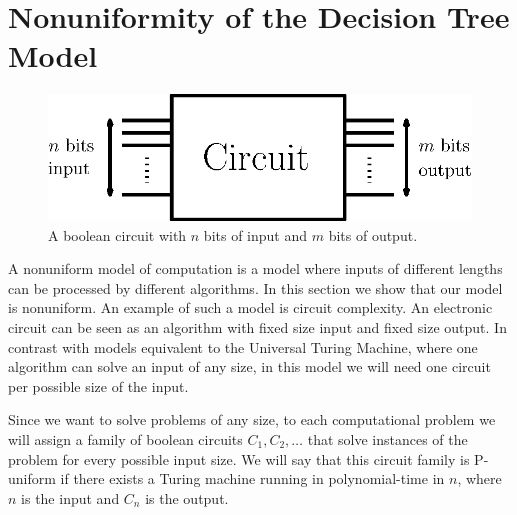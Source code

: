 \section{Nonuniformity of the Decision Tree Model}
\label{tree:sorting:nonuniformity}

\begin{figure}
\center
\includegraphics[height=0.2\textheight]{fig/sorting/model/circuit}
\caption{A boolean circuit with \(n\) bits of input and \(m\) bits of output.}
\label{fig:sorting:nonuniformity:circuit}
\end{figure}

A nonuniform model of computation is a model where inputs of different
lengths can be processed by different algorithms. In this section we show that
our model is nonuniform. An example of such a model is circuit complexity. An
electronic circuit can be seen as an algorithm with fixed size input and fixed
size output. In contrast with models equivalent to the Universal Turing
Machine, where one algorithm can solve an input of any size, in this model we
will need one circuit per possible size of the input.

Since we want to solve problems of any size, to each computational problem we
will assign a family of boolean circuits \(C_1,C_2,\ldots\) that solve
instances of the problem for every possible input size. We will say that this
circuit family is P-uniform if there exists a Turing machine running in
polynomial-time in \(n\), where \(n\) is the input and \(C_n\) is the output.

